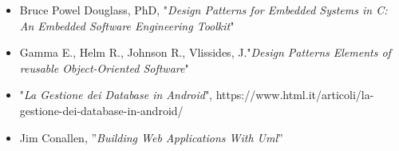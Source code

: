 
\begin{itemize}
	\item  Bruce Powel Douglass, PhD, "\textit{Design Patterns for Embedded Systems in C: An Embedded Software Engineering Toolkit}"
	\item Gamma E., Helm R., Johnson R., Vlissides, J."\textit{Design Patterns Elements of reusable Object-Oriented Software}"
	\item "\textit{La Gestione dei Database in Android}", https://www.html.it/articoli/la-gestione-dei-database-in-android/
	\item Jim Conallen, ''\textit{Building Web Applications With Uml}''
\end{itemize}